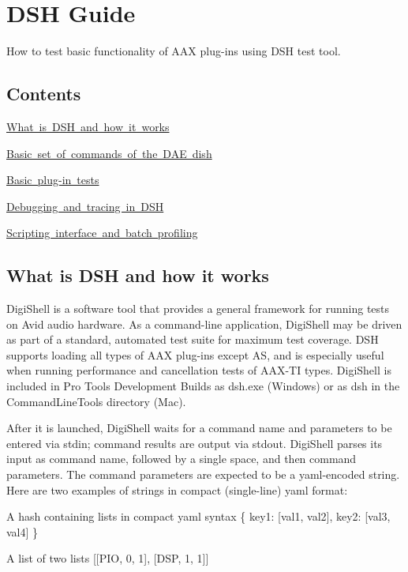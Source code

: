 \hypertarget{a00835}{}\section{D\+SH Guide}
\label{a00835}
How to test basic functionality of A\+AX plug-\/ins using D\+SH test tool. 

\hypertarget{a00835_dsh_guide_contents}{}\subsection{Contents}\label{a00835_dsh_guide_contents}
\begin{DoxyItemize}
\item \mbox{\hyperlink{a00835_dsh_guide_00_what_is_dsh_and_how_it_works}{What is D\+SH and how it works}} \item \mbox{\hyperlink{a00835_dsh_guide_01_basic_set_of_commands_of_dae_dish}{Basic set of commands of the D\+AE dish}} \item \mbox{\hyperlink{a00835_dsh_guide_02_basic_plugin_tests}{Basic plug-\/in tests}} \item \mbox{\hyperlink{a00835_dsh_guide_03_debugging_and_tracing}{Debugging and tracing in D\+SH}} \item \mbox{\hyperlink{a00835_dsh_guide_04_scripting_interface_and_batch_profiling}{Scripting interface and batch profiling}}\end{DoxyItemize}
 \hypertarget{a00835_dsh_guide_00_what_is_dsh_and_how_it_works}{}\subsection{What is D\+S\+H and how it works}\label{a00835_dsh_guide_00_what_is_dsh_and_how_it_works}
 Digi\+Shell is a software tool that provides a general framework for running tests on Avid audio hardware. As a command-\/line application, Digi\+Shell may be driven as part of a standard, automated test suite for maximum test coverage. D\+SH supports loading all types of A\+AX plug-\/ins except AS, and is especially useful when running performance and cancellation tests of A\+A\+X-\/\+TI types. Digi\+Shell is included in Pro Tools Development Builds as dsh.\+exe (Windows) or as dsh in the Command\+Line\+Tools directory (Mac).

After it is launched, Digi\+Shell waits for a command name and parameters to be entered via stdin; command results are output via stdout. Digi\+Shell parses its input as command name, followed by a single space, and then command parameters. The command parameters are expected to be a yaml-\/encoded string. Here are two examples of strings in compact (single-\/line) yaml format\+: 
\begin{DoxyItemize}
\item A hash containing lists in compact yaml syntax  {\ttfamily \{ key1\+: \mbox{[}val1, val2\mbox{]}, key2\+: \mbox{[}val3, val4\mbox{]} \}} ~\newline
  
\item A list of two lists  {\ttfamily \mbox{[}\mbox{[}P\+IO, 0, 1\mbox{]}, \mbox{[}D\+SP, 1, 1\mbox{]}\mbox{]}} 


\end{DoxyItemize}

